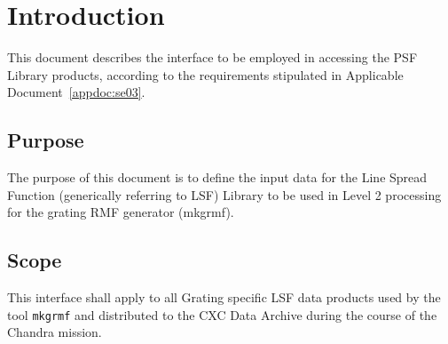 \documentclass[twoside]{article}
\begin{document}

\tableofcontents
\clearpage


\section{Introduction}

This document describes the interface to be employed in accessing
the PSF Library products, according to the requirements stipulated in
Applicable Document~\ref{appdoc:se03}.%
%

\subsection{Purpose}

The purpose of this document is to define the input data for the Line
Spread Function (generically referring to LSF) Library to be used in
Level 2 processing for the grating RMF generator (mkgrmf).
%

\subsection{Scope}

This interface shall apply to all Grating specific LSF
data products used by the tool {\tt mkgrmf}
and distributed to the CXC Data
Archive during the course of
the Chandra mission.
\end{document}
